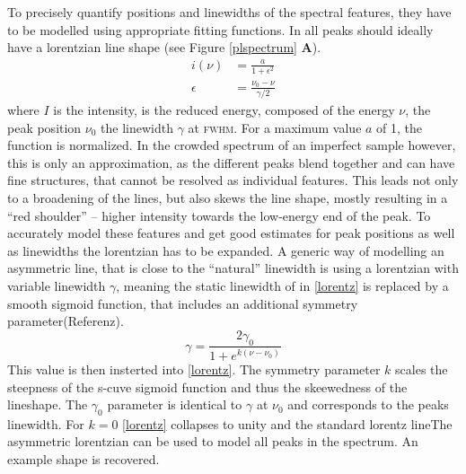 To precisely quantify positions and linewidths of the spectral features, they have to be modelled using appropriate fitting functions. In \pl all peaks should ideally have a lorentzian line shape (see Figure \ref{plspectrum} \textbf{A}). 
\begin{align}
i(\nu)&= \frac{a}{1+\epsilon^2} \\
\epsilon &= \frac{\nu_0 - \nu}{\gamma /2}\label{lorentz}
\end{align}
where $I$ is the intensity, \epsilon is the reduced energy, composed of the energy $\nu$, the peak position $\nu_0$ the linewidth $\gamma$ at \textsc{fwhm}. For a maximum value $a$ of 1, the function is normalized. In the crowded spectrum of an imperfect sample however, this is only an approximation, as the different peaks blend together and can have fine structures, that cannot be resolved as individual features. This leads not only to a broadening of the lines, but also skews the line shape, mostly resulting in a ``red shoulder'' -- higher intensity towards the low-energy end of the peak. To accurately model these features and get good estimates for peak positions as well as linewidths the lorentzian has to be expanded. A generic way of modelling an asymmetric line, that is close to the ``natural'' linewidth is using a lorentzian with variable linewidth $\gamma$, meaning the static linewidth of in \ref{lorentz} is replaced by a smooth sigmoid function, that includes an additional symmetry parameter(Referenz).
\begin{equation} \gamma = \frac{2\gamma_0}{1+e^{k(\nu-\nu_0)}}\label{asymlorentz} \end{equation}
This value is then insterted into \eqref{lorentz}. The symmetry parameter $k$ scales the steepness of the s-cuve sigmoid function and thus the skeewedness of the lineshape. The $\gamma_0$ parameter is identical to $\gamma$ at $\nu_0$ and corresponds to the peaks linewidth. For $k=0$ \eqref{lorentz} collapses to unity and the standard lorentz lineThe asymmetric lorentzian can be used to model all peaks in the \pl spectrum. An example shape is recovered.

